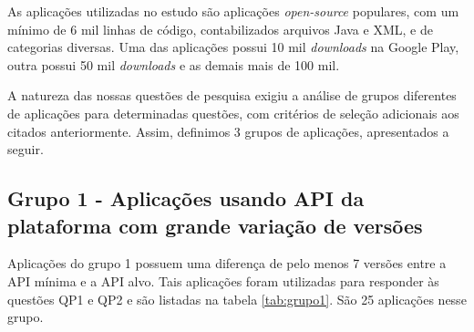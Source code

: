 As aplicações utilizadas no estudo são aplicações \textit{open-source} populares,
com um mínimo de 6 mil linhas de código, contabilizados arquivos Java e XML, e de
categorias diversas. Uma das aplicações possui 10 mil \textit{downloads} na Google
Play, outra possui 50 mil \textit{downloads} e as demais mais de 100 mil.

A natureza das nossas questões de pesquisa exigiu a análise de grupos diferentes
de aplicações para determinadas questões, com critérios de seleção adicionais aos
citados anteriormente. Assim, definimos 3 grupos de aplicações, apresentados a seguir.

\subsection{Grupo 1 - Aplicações usando API da plataforma com grande variação de versões}
Aplicações do grupo 1 possuem uma diferença de pelo menos 7 versões entre a API mínima e
a API alvo. Tais aplicações foram utilizadas para responder às questões QP1 e QP2 e são
listadas na tabela
\ref{tab:grupo1}. São 25 aplicações nesse grupo.

